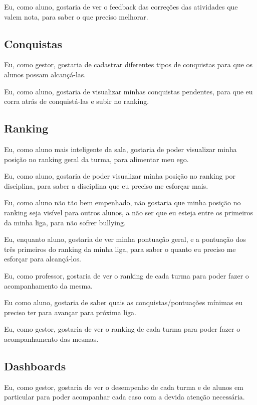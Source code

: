 Eu, como aluno, gostaria de ver o feedback das correções das atividades que valem nota, para saber o que preciso melhorar.

\subsection{Conquistas}

Eu, como gestor, gostaria de cadastrar diferentes tipos de conquistas para que os alunos possam alcançá-las.

Eu, como aluno, gostaria de visualizar minhas conquistas pendentes, para que eu corra atrás de conquistá-las e subir no ranking.

\subsection{Ranking}

Eu, como aluno mais inteligente da sala, gostaria de poder visualizar minha posição no ranking geral da turma, para alimentar meu ego.

Eu, como aluno, gostaria de poder visualizar minha posição no ranking por disciplina, para saber a disciplina que eu preciso me esforçar mais.

Eu, como aluno não tão bem empenhado, não gostaria que minha posição no ranking seja visível para outros alunos, a não ser que eu esteja entre os primeiros da minha liga, para não sofrer bullying.

Eu, enquanto aluno, gostaria de ver minha pontuação geral, e a pontuação dos três primeiros do ranking da minha liga, para saber o quanto eu preciso me esforçar para alcançá-los.
 
Eu, como professor, gostaria de ver o ranking de cada turma para poder fazer o acompanhamento da mesma.

Eu como aluno, gostaria de saber quais as conquistas/pontuações mínimas eu preciso ter para avançar para próxima liga.

Eu, como gestor, gostaria de ver o ranking de cada turma para poder fazer o acompanhamento das mesmas.

\subsection{Dashboards}

Eu, como gestor, gostaria de ver o desempenho de cada turma e de alunos em particular para poder acompanhar cada caso com a devida atenção necessária.


